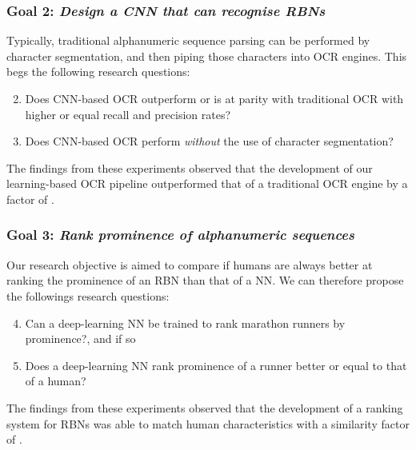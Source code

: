 \subsubsection*{Goal 2: \itshape Design a CNN that can recognise RBNs}

Typically, traditional alphanumeric sequence parsing can be performed by character segmentation, and then piping those characters into OCR engines.
This begs the following research questions:
\begin{enumerate}[label=\bfseries~RQ\arabic*), leftmargin=2cm, rightmargin=1.5cm]
  \setcounter{enumi}{1}
  \item\label{rq:2} Does CNN-based OCR outperform or is at parity with traditional OCR with higher or equal recall and precision rates?
  \item\label{rq:3} Does CNN-based OCR perform \textit{without} the use of character segmentation?
\end{enumerate}
The findings from these experiments observed that the development of our learning-based OCR pipeline outperformed that of a traditional OCR engine by a factor of .

\subsubsection*{Goal 3: \itshape Rank prominence of alphanumeric sequences}

Our research objective is aimed to compare if humans are always better at ranking the prominence of an RBN than that of a NN.
We can therefore propose the followings research questions:
\begin{enumerate}[label=\bfseries~RQ\arabic*), leftmargin=2cm, rightmargin=1.5cm]
  \setcounter{enumi}{3}
  \item\label{rq:4} Can a deep-learning NN be trained to rank marathon runners by prominence?, and if so
  \item\label{rq:5} Does a deep-learning NN rank prominence of a runner better or equal to that of a human?
\end{enumerate}
The findings from these experiments observed that the development of a ranking system for RBNs was able to match human characteristics with a similarity factor of .

